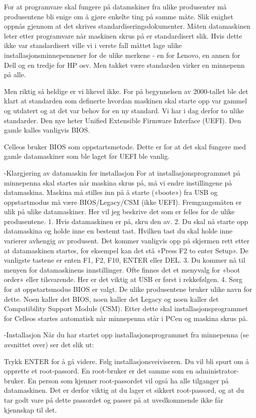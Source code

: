 For at programvare skal fungere på datamskiner fra ulike produsenter må produsentene bli enige om  å gjøre enkelte ting på samme måte. Slik enighet oppnås gjennom at det skrives standardiseringsdokumenter. Måten datamaskinen leter etter programvare når maskinen skrus på er standardisert slik. Hvis dette ikke var standardisert ville vi i verste fall måttet lage ulike installasjonsminnepennener for de ulike merkene - en for Lenovo, en annen for Dell og  en tredje for HP osv. Men takket være standarden virker en minnepenn på alle.

Men riktig så heldige er vi likevel ikke. For på begynnelsen av 2000-tallet ble det klart at standarden som definerte hvordan maskinen skal starte opp var gammel og utdatert og at det var behov for en ny standard. Vi har i dag derfor to ulike standarder. Den nye heter Unified Extensible Firmware Interface (UEFI). Den gamle kalles vanligvis BIOS. 

Celleos bruker BIOS som oppstartsmetode. Dette er for at det skal fungere med gamle datamaskiner som ble laget før UEFI ble vanlig. 

-Klargjøring av datamaskin før installasjon
For at installasjonsprogrammet på minnepenna skal startes når maskina skrus på, må vi endre instillingene på datamaskina. Maskina må stilles inn på å starte («boote») fra USB og oppstartmodus må være BIOS/Legacy/CSM (ikke UEFI). Fremgangsmåten er ulik på ulike datamaskiner. Her vil jeg beskrive det som er felles for de ulike produsentene. 
1.	Hvis datamaskinen er på, skru den av.
2.	Du skal nå starte opp datamaskina og holde inne en bestemt tast. Hvilken tast du skal holde inne varierer avhengig av produsent. Det kommer vanligvis opp på skjermen rett etter at datamaskinen startes, for eksempel kan det stå «Press F2 to enter Setup». De vanligste tastene er enten F1, F2, F10, ENTER eller DEL.
3.	Du kommer nå til menyen for datamaskinens innstillinger. Ofte finnes det et menyvalg for «boot order» eller tilsvarende. Her er det viktig at USB er først i rekkefølgen.
4.	Sørg for at oppstartsmodus BIOS er valgt. De ulike produsentene bruker ulike navn for dette. Noen kaller det BIOS, noen kaller det Legacy og noen kaller det Compatibility Support Module (CSM). 
Etter dette skal installasjonsprogrammet for Celleos startes automatisk når minnepenna står i PCen og maskina skrus på.


-Installasjon
Når du har startet opp installasjonsprogrammet fra minnepenna (se avsnittet over) ser det slik ut:
\centerline{
\epsfxsize 9cm
}
Trykk ENTER for å gå videre.
Følg installasjonsveiviseren. Du vil bli spurt om å opprette et root-passord. En root-bruker er det samme som en administrator-bruker. En person som kjenner root-passordet vil også ha alle tilganger på datamaskinen. Det er derfor viktig at du lager et sikkert root-passord, og at du tar godt vare på dette passordet og passer på at uvedkommende ikke får kjennskap til det. 

